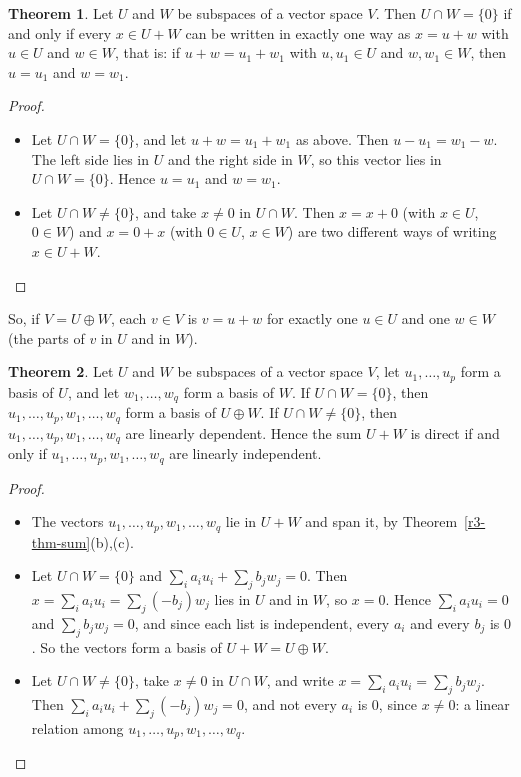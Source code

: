 \documentclass[12pt]{article}
\theoremstyle{definition}
\newtheorem{theorem}{Theorem}
\begin{document}
\begin{theorem}\label{r3-thm-direct-sum}
Let \(U\) and \(W\) be subspaces of a vector space \(V\). Then \(U\cap W=\{0\}\) if and only if
every \(x\in U+W\) can be written in exactly one way as \(x=u+w\) with \(u\in U\) and \(w\in W\),
that is: if \(u+w=u_1+w_1\) with \(u,u_1\in U\) and \(w,w_1\in W\), then \(u=u_1\) and \(w=w_1\).
\end{theorem}
\begin{proof}
\begin{itemize}
\item Let \(U\cap W=\{0\}\), and let \(u+w=u_1+w_1\) as above. Then \(u-u_1=w_1-w\). The left
side lies in \(U\) and the right side in \(W\), so this vector lies in \(U\cap W=\{0\}\). Hence
\(u=u_1\) and \(w=w_1\).
\item Let \(U\cap W\ne\{0\}\), and take \(x\ne0\) in \(U\cap W\). Then \(x=x+0\) (with \(x\in U\),
\(0\in W\)) and \(x=0+x\) (with \(0\in U\), \(x\in W\)) are two different ways of writing
\(x\in U+W\).\qedhere
\end{itemize}
\end{proof}
So, if \(V=U\oplus W\), each \(v\in V\) is \(v=u+w\) for exactly one \(u\in U\) and one
\(w\in W\) (the parts of \(v\) in \(U\) and in \(W\)).

\begin{theorem}\label{r3-thm-direct-sum-basis}
Let \(U\) and \(W\) be subspaces of a vector space \(V\), let \(u_1,\dots,u_p\) form a basis of
\(U\), and let \(w_1,\dots,w_q\) form a basis of \(W\). If \(U\cap W=\{0\}\), then
\(u_1,\dots,u_p,w_1,\dots,w_q\) form a basis of \(U\oplus W\). If \(U\cap W\ne\{0\}\), then
\(u_1,\dots,u_p,w_1,\dots,w_q\) are linearly dependent. Hence the sum \(U+W\) is direct if and
only if \(u_1,\dots,u_p,w_1,\dots,w_q\) are linearly independent.
\end{theorem}
\begin{proof}
\begin{itemize}
\item The vectors \(u_1,\dots,u_p,w_1,\dots,w_q\) lie in \(U+W\) and span it, by
Theorem~\ref{r3-thm-sum}(b),(c).
\item Let \(U\cap W=\{0\}\) and \(\sum_ia_iu_i+\sum_jb_jw_j=0\). Then
\(x=\sum_ia_iu_i=\sum_j(-b_j)w_j\) lies in \(U\) and in \(W\), so \(x=0\). Hence
\(\sum_ia_iu_i=0\) and \(\sum_jb_jw_j=0\), and since each list is independent, every \(a_i\) and
every \(b_j\) is \(0\). So the vectors form a basis of \(U+W=U\oplus W\).
\item Let \(U\cap W\ne\{0\}\), take \(x\ne0\) in \(U\cap W\), and write
\(x=\sum_ia_iu_i=\sum_jb_jw_j\). Then \(\sum_ia_iu_i+\sum_j(-b_j)w_j=0\), and not every \(a_i\)
is \(0\), since \(x\ne0\): a linear relation among \(u_1,\dots,u_p,w_1,\dots,w_q\).\qedhere
\end{itemize}
\end{proof}
\end{document}
